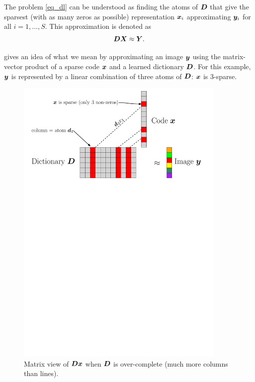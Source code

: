 \noindent
The problem \eqref{eq_dl} can be understood as finding the atoms of $\bm{D}$ that give the sparsest (with as many zeros as possible) representation $\bm{x}_i$ approximating $\bm{y}_i$ for all $i = 1,\dots,S$. This approximation is denoted as
\begin{equation*}\bm{D}\bm{X} \approx \bm{Y}.\end{equation*}

\noindent
{} gives an idea of what we mean by approximating an image $\bm{y}$ using the matrix-vector product of a sparse code $\bm{x}$ and a learned dictionary $\bm{D}$. For this example, $\bm{y}$ is represented by a linear combination of three atoms of $\bm{D}$: $\bm{x}$ is 3-sparse.

\begin{figure}[!ht] \centering
\includegraphics[width=0.90\textwidth]{figures/sparsity-matrix.pdf}
\caption{Matrix view of $\bm{D}\bm{x}$ when $\bm{D}$ is over-complete (much more columns than lines).}\label{fig_overcomplete_matrix}
\end{figure}



